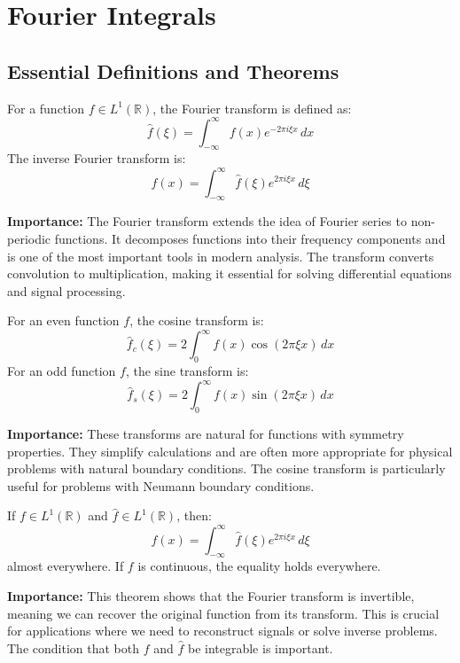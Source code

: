 \section{Fourier Integrals}

\subsection*{Essential Definitions and Theorems}

\begin{definition}
For a function $f \in L^1(\mathbb{R})$, the Fourier transform is defined as:
\[\hat{f}(\xi) = \int_{-\infty}^{\infty} f(x) e^{-2\pi i \xi x} \, dx\]
The inverse Fourier transform is:
\[f(x) = \int_{-\infty}^{\infty} \hat{f}(\xi) e^{2\pi i \xi x} \, d\xi\]
\end{definition}

\noindent\textbf{Importance:} The Fourier transform extends the idea of Fourier series to non-periodic functions. It decomposes functions into their frequency components and is one of the most important tools in modern analysis. The transform converts convolution to multiplication, making it essential for solving differential equations and signal processing.



\begin{definition}
For an even function $f$, the cosine transform is:
\[\hat{f}_c(\xi) = 2 \int_0^{\infty} f(x) \cos(2\pi \xi x) \, dx\]
For an odd function $f$, the sine transform is:
\[\hat{f}_s(\xi) = 2 \int_0^{\infty} f(x) \sin(2\pi \xi x) \, dx\]
\end{definition}

\noindent\textbf{Importance:} These transforms are natural for functions with symmetry properties. They simplify calculations and are often more appropriate for physical problems with natural boundary conditions. The cosine transform is particularly useful for problems with Neumann boundary conditions.



\begin{theorem}
If $f \in L^1(\mathbb{R})$ and $\hat{f} \in L^1(\mathbb{R})$, then:
\[f(x) = \int_{-\infty}^{\infty} \hat{f}(\xi) e^{2\pi i \xi x} \, d\xi\]
almost everywhere. If $f$ is continuous, the equality holds everywhere.
\end{theorem}

\noindent\textbf{Importance:} This theorem shows that the Fourier transform is invertible, meaning we can recover the original function from its transform. This is crucial for applications where we need to reconstruct signals or solve inverse problems. The condition that both $f$ and $\hat{f}$ be integrable is important.



